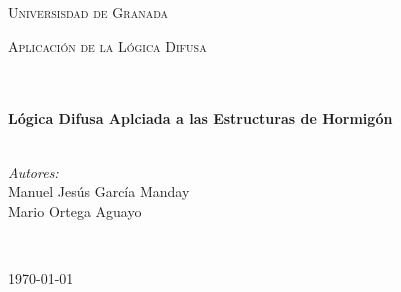 \documentclass[10pt]{article}
\begin{document}
\begin{center}
\vspace*{0.5cm}								%
\textsc{\huge Universisdad de Granada}\\[1.5cm]	


\begin{minipage}{0.9\textwidth} 
\begin{center}																					%
\textsc{\LARGE Aplicación de la Lógica Difusa}
\end{center}
\end{minipage}\\[0.5cm]
 			\vspace*{1cm}																		%
\HRule \\[0.4cm]																	%
{ \huge \bfseries Lógica Difusa Aplciada a las Estructuras de Hormigón}\\[0.4cm]	%
\HRule \\[1.5cm]																	%
\begin{minipage}{0.46\textwidth}													%
\begin{flushleft} \large															%
\emph{Autores:}\\	
Manuel Jesús García Manday
\\Mario Ortega Aguayo
\end{flushleft}																		%
\end{minipage}		
\begin{minipage}{0.52\textwidth}		
\vspace{-0.6cm}											%
\begin{flushright} \large															%
\end{flushright}																	%
\end{minipage}	
\vspace*{1cm}
 	
 		\\																		%
\vspace{2cm} 																				
\begin{center}																					
{\large \today}																	%
 			\end{center}												  						
\end{center}							 											
																					
\end{document}
